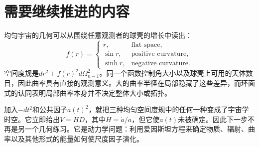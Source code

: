 \begin{classroomqa}
\end{classroomqa}

\begin{classroomqa}
\end{classroomqa}

\begin{classroomqa}
\end{classroomqa}

\section{需要继续推进的内容}

均匀宇宙的几何可以从围绕任意观测者的球壳的增长中读出：
\begin{equation}
f(r)=
\begin{cases}
r, & \text{flat space},\\
\sin r, & \text{positive curvature},\\
\sinh r, & \text{negative curvature}.
\end{cases}
\end{equation}
空间度规是\(dr^2+f(r)^2d\Omega_{n-1}^2\)。同一个函数控制角大小以及球壳上可用的天体数目，因此曲率具有直接的观测意义。大的曲率半径在局部隐藏了这些差异，而环面式的认同表明局部曲率本身并不决定整体大小或拓扑。

加入\(-dt^2\)和公共因子\(a(t)^2\)，就把三种均匀空间度规中的任何一种变成了宇宙学时空。它立即给出\(V=HD\)，其中\(H=\dot a/a\)，但它使\(a(t)\)未被确定。因此下一步不再是另一个几何练习。它是动力学问题：利用爱因斯坦方程来确定物质、辐射、曲率以及其他形式的能量如何使尺度因子演化。
